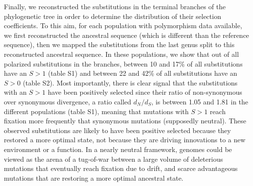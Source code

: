 \documentclass{article}
\newcommand{\dn}{d_N}
\newcommand{\ds}{d_S}
\newcommand{\dnds}{\dn / \ds}
\newcommand{\Sphy}{S}
\begin{document}
    Finally, we reconstructed the substitutions in the terminal branches of the phylogenetic tree in order to determine the distribution of their selection coefficients.
    To this aim, for each population with polymorphism data available, we first reconstructed the ancestral sequence (which is different than the reference sequence), then we mapped the substitutions from the last genus split to this reconstructed ancestral sequence.
    In these populations, we show that out of all polarized substitutions in the branches, between 10 and 17\% of all substitutions have an $\Sphy > 1$ (table S1) and between 22 and 42\% of all substitutions have an $\Sphy > 0$ (table S2).
    Most importantly, there is clear signal that the substitutions with an $\Sphy > 1$ have been positively selected since their ratio of non-synonymous over synonymous divergence, a ratio called $\dnds$, is between 1.05 and 1.81 in the different populations (table S1), meaning that mutations with $\Sphy > 1$ reach fixation more frequently that synonymous mutations (supposedly neutral).
    These observed substitutions are likely to have been positive selected because they restored a more optimal state, not because they are driving innovations to a new environment or a function.
    In a nearly neutral framework, genomes could be viewed as the arena of a tug-of-war between a large volume of deleterious mutations that eventually reach fixation due to drift, and scarce advantageous mutations that are restoring a more optimal ancestral state.
\end{document}
